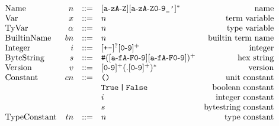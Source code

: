 \documentclass[../plutus-core-specification.tex]{subfiles}
\begin{document}
\begin{minipage}{\linewidth}
    \centering
    \[\begin{array}{lrclr}
        \textrm{Name}        & n      & ::= & [\texttt{a}\!\hyphen{}\!\texttt{z}\texttt{A}\!\hyphen{}\!\texttt{Z}][\texttt{a}\!\hyphen{}\!\texttt{zA}\!\hyphen{}\!\texttt{Z0}\!\hyphen{}\!\texttt{9\_'}]^*   & \textrm{name}\\
        \textrm{Var}           & x      & ::= & n & \textrm{term variable}\\
        \textrm{TyVar}         & \alpha & ::= & n & \textrm{type variable}\\
        \textrm{BuiltinName}   & bn     & ::= & n & \textrm{builtin term name}\\
        \textrm{Integer} & i  & ::= & [\texttt{+-}]^?[\texttt{0}\!\hyphen{}\!\texttt{9}]^+ & \textrm{integer}\\
        \textrm{ByteString}   & s  & ::= & \texttt{\#}([\texttt{a}\!\hyphen{}\!\texttt{fA}\!\hyphen{}\!\texttt{F0}\!\hyphen{}\!\texttt{9}][\texttt{a}\!\hyphen{}\!\texttt{fA}\!\hyphen{}\!\texttt{F0}\!\hyphen{}\!\texttt{9}])^+ & \textrm{hex string}\\
        \textrm{Version} & v & ::= & [\texttt{0}\!\hyphen{}\!\texttt{9}]^+(.[\texttt{0}\!\hyphen{}\!\texttt{9}]^+)^* & \textrm{version}\\
        \textrm{Constant} & cn & ::= & \texttt{()} & \textrm{unit constant}\\
                          &    &     & \true \texttt{\,|\,} \false & \textrm{boolean constant}\\
                          &    &     & i & \textrm{integer constant}\\
                          &    &     & s & \textrm{bytestring constant}\\
        \textrm{TypeConstant} & tn    & ::= & n & \textrm{type constant}\\
    \end{array}\]
    \label{fig:lexical-grammar}
\end{minipage}
\end{document}
